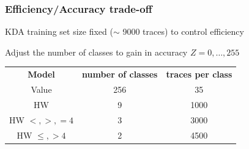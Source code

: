 \begin{frame}
\frametitle{Efficiency/Accuracy trade-off}

KDA training set size fixed ($\sim$ 9000 traces) to control efficiency\\

\begin{block}{Adjust the number of classes to gain in accuracy}
$Z = 0,\dots, 255 $\\
\centering
\begin{tabular}{|c|c|c|}
\hline 
\textbf{Model} & \textbf{number of classes} & \textbf{traces per class} \\
Value & 256 & 35\\
HW & 9 & 1000 \\
HW $<,>,= 4$ & 3 & 3000 \\
HW $\leq,> 4$ & 2 & 4500 \\
\hline
\end{tabular}

\end{block}
\end{frame}







